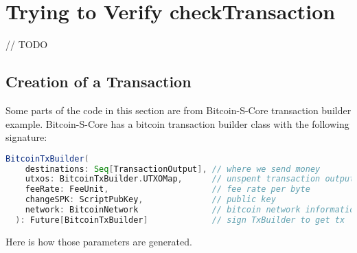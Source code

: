 \chapter{Trying to Verify checkTransaction}
\label{chap:connecting}
// TODO

\section{Creation of a Transaction}
Some parts of the code in this section are from Bitcoin-S-Core transaction builder example.\cite{BitcoinSCore:txbuilderexample}
Bitcoin-S-Core has a bitcoin transaction builder class with the following signature:
\begin{lstlisting}[language=scala]
  BitcoinTxBuilder(
    destinations: Seq[TransactionOutput], // where we send money
    utxos: BitcoinTxBuilder.UTXOMap,      // unspent transaction outputs
    feeRate: FeeUnit,                     // fee rate per byte
    changeSPK: ScriptPubKey,              // public key
    network: BitcoinNetwork               // bitcoin network information
  ): Future[BitcoinTxBuilder]             // sign TxBuilder to get tx
\end{lstlisting}
Here is how those parameters are generated.

